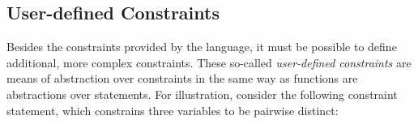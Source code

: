





\subsection{User-defined Constraints}


Besides the constraints provided by the language, it must be possible
to define additional, more complex constraints.  These so-called {\em
  user-defined constraints} are means of abstraction over constraints
in the same way as functions are abstractions over statements.  For
illustration, consider the following constraint statement, which
constrains three variables to be pairwise distinct:

